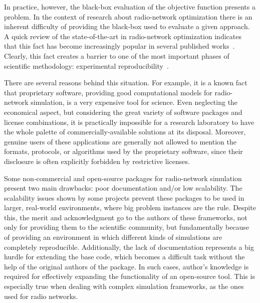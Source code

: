 In practice, however, the black-box evaluation of the objective function
presents a problem. In the context of research about radio-network
optimization there is an inherent difficulty of providing the black-box
used to evaluate a given approach. A quick review of the state-of-the-art
in radio-network optimization indicates that this fact has become
increasingly popular in several published works~\cite{Amaldi-Radio_planning_and_coverage_optimization_of_3G_networks:2008,chen2008automated,Chen-Fast_algorithm_for_large_scale_UMTS_coverage_planning:2009,Antenna.azimuth.tilt:2009,Antenna.Configuration:2008,Siomina:Minimum.pilot.power.for.service.coverage}.
Clearly, this fact creates a barrier to one of the most important
phases of scientific methodology: experimental reproducibility~\cite{gauch2002scientific}. 

There are several reasons behind this situation. For example, it is
a known fact that proprietary software, providing good computational
models for radio-network simulation, is a very expensive tool for
science. Even neglecting the economical aspect, but considering the
great variety of software packages and license combinations, it is
practically impossible for a research laboratory to have the whole
palette of commercially-available solutions at its disposal. Moreover,
genuine users of these applications are generally not allowed to mention
the formats, protocols, or algorithms used by the proprietary software,
since their disclosure is often explicitly forbidden by restrictive
licenses.

Some non-commercial and open-source packages for radio-network simulation~\cite{Ozimek_Open.source.radio.coverage.prediction:2010,Momentum.project,Mehlfuhrer_The_Vienna_LTE_Simulators_enabling_reproducibility_in_wireless_communications_research:2011,Pillekeit-A_hybrid_simulation_framework_for_the_evaluation_of_common_RRM:2012,Piro_Simulating_LTE_cellular_systems_an_open_source_framework:2011,Yeung-Detailed_OFDM_modeling_in_network_simulation:2004}
present two main drawbacks: poor documentation and/or low scalability.
The scalability issues shown by some projects prevent these packages
to be used in larger, real-world environments, where big problem instances
are the rule. Despite this, the merit and acknowledgment go to the
authors of these frameworks, not only for providing them to the scientific
community, but fundamentally because of providing an environment in
which different kinds of simulations are completely reproducible.
Additionally, the lack of documentation represents a big hurdle for
extending the base code, which becomes a difficult task without the
help of the original authors of the package. In such cases, author's
knowledge is required for effectively expanding the functionality
of an open-source tool. This is especially true when dealing with
complex simulation frameworks, as the ones used for radio networks.


